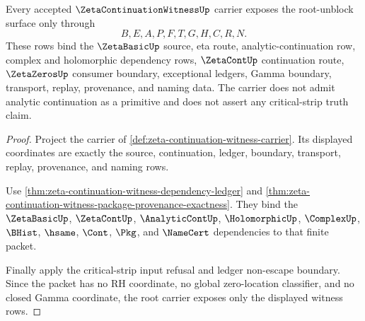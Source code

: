 \begin{theorem}
\label{thm:zeta-continuation-witness-root-carrier-exposure}
Every accepted $\ZetaContinuationWitnessUp$ carrier exposes the root-unblock surface only through
$$
B,E,A,P,F,T,G,H,C,R,N.
$$
These rows bind the $\ZetaBasicUp$ source, eta route, analytic-continuation row, complex and holomorphic dependency rows, $\ZetaContUp$ continuation route, $\ZetaZerosUp$ consumer boundary, exceptional ledgers, Gamma boundary, transport, replay, provenance, and naming data. The carrier does not admit analytic continuation as a primitive and does not assert any critical-strip truth claim.
\end{theorem}
\begin{proof}
Project the carrier of \autoref{def:zeta-continuation-witness-carrier}. Its displayed coordinates are exactly the source, continuation, ledger, boundary, transport, replay, provenance, and naming rows.

Use \autoref{thm:zeta-continuation-witness-dependency-ledger} and \autoref{thm:zeta-continuation-witness-package-provenance-exactness}. They bind the $\ZetaBasicUp$, $\ZetaContUp$, $\AnalyticContUp$, $\HolomorphicUp$, $\ComplexUp$, $\BHist$, $\hsame$, $\Cont$, $\Pkg$, and $\NameCert$ dependencies to that finite packet.

Finally apply the critical-strip input refusal and ledger non-escape boundary. Since the packet has no RH coordinate, no global zero-location classifier, and no closed Gamma coordinate, the root carrier exposes only the displayed witness rows.
\end{proof}

